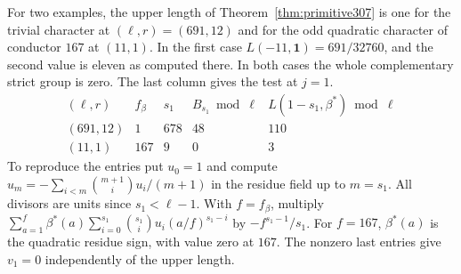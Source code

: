 \documentclass[a4paper,11pt]{article}
\theoremstyle{definition}
\theoremstyle{remark}
\numberwithin{equation}{section}
\begin{document}
For two examples, the upper length of
Theorem~\ref{thm:primitive307} is one for the trivial character
at \((\ell,r)=(691,12)\) and for the odd quadratic character
of conductor \(167\) at \((11,1)\). In the first case
\(L(-11,\mathbf 1)=691/32760\), and the second value is
eleven as computed there. In both cases the whole
complementary strict group is zero. The last column gives
the test at \(j=1\).
\[
\begin{array}{c|r|r|r|r}
 (\ell,r)&f_\beta&s_1&B_{s_1}\bmod\ell&
                    L(1-s_1,\beta^*)\bmod\ell\\ \hline
 (691,12)&1&678&48&110\\
 (11,1)&167&9&0&3
\end{array}
\]
To reproduce the entries put \(u_0=1\) and compute
\(u_m=-\sum_{i<m}\binom{m+1}{i}u_i/(m+1)\) in the residue
field up to \(m=s_1\). All divisors are units since
\(s_1<\ell-1\). With \(f=f_\beta\), multiply
\(\sum_{a=1}^f\beta^*(a)\sum_{i=0}^{s_1}\binom{s_1}{i}
u_i(a/f)^{s_1-i}\) by \(-f^{s_1-1}/s_1\).
For \(f=167\), \(\beta^*(a)\) is the quadratic residue sign,
with value zero at \(167\). The nonzero last entries give
\(v_1=0\) independently of the upper length.
\end{document}
